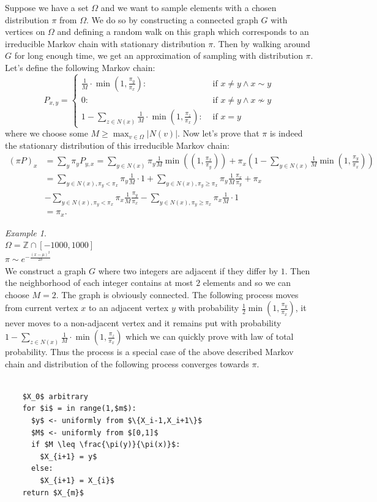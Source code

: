 \documentclass[a4paper, 12pt]{book}
\theoremstyle{definition}
\theoremstyle{remark}
\newtheorem*{ex}{Example}
\newcommand{\Z}{\mathbb{Z}}
\begin{document}
Suppose we have a set $\Omega$ and we want to sample elements with a chosen distribution $\pi$ from $\Omega$. We do so by constructing 
a connected graph $G$ with vertices on $\Omega$ and defining a random walk on this graph which corresponds to an irreducible Markov chain
with stationary distribution $\pi$. Then by walking around $G$ for long enough time, we get an approximation of sampling with distribution $\pi$.
Let's define the following Markov chain:
$$P_{x,y} = \begin{cases}
  \frac{1}{M} \cdot \min \left(1, \frac{\pi_y}{\pi_x}\right): &\text{ if } x \neq y \land x \sim y \\
  0: &\text{ if } x \neq y \land x \nsim y \\
  1 - \sum_{z \in N(x)}\frac{1}{M} \cdot \min \left(1, \frac{\pi_z}{\pi_x}\right): &\text{ if } x = y
\end{cases}$$
where we choose some $M \geq \max_{v \in \Omega} |N(v)|$. Now let's prove that $\pi$ is indeed the stationary distribution of this irreducible
Markov chain:
\begin{align*}
  (\pi P)_x &= \sum_y \pi_y P_{y,x} =
    \sum_{y \in N(x)} \pi_y \frac{1}{M} \min \left(\left(1, \frac{\pi_x}{\pi_y}\right)\right)
    + \pi_x \left(1 - \sum_{y \in N(x)} \frac{1}{M} \min \left(1, \frac{\pi_y}{\pi_x}\right)\right) \\
  &= \sum_{y \in N(x), \pi_y < \pi_x} \pi_y \frac{1}{M} \cdot 1 +
    \sum_{y \in N(x), \pi_y \geq \pi_x} \pi_y \frac{1}{M} \frac{\pi_x}{\pi_y} + \pi_x \\
  &- \sum_{y \in N(x), \pi_y < \pi_x} \pi_x \frac{1}{M} \frac{\pi_y}{\pi_x} -
    \sum_{y \in N(x), \pi_y \geq \pi_x} \pi_x \frac{1}{M} \cdot 1 \\
  &= \pi_x.
\end{align*}
\begin{ex} \text{} \\
  $\Omega = \Z \cap [-1000,1000]$ \\
  $\pi \sim e^{-\frac{(x-\mu)^2}{2 \delta}}$ \\
  We construct a graph $G$ where two integers are adjacent if they differ by $1$. Then the neighborhood of each
  integer contains at most $2$ elements and so we can choose $M = 2$. The graph is obviously connected. The following
  process moves from current vertex $x$ to an adjacent vertex $y$ with probability $\frac{1}{2} \min \left(1, \frac{\pi_y}{\pi_x}\right)$,
  it never moves to a non-adjacent vertex and it remains put with probability $1 - \sum_{z \in N(x)}\frac{1}{M} \cdot \min \left(1, \frac{\pi_z}{\pi_x}\right)$
  which we can quickly prove with law of total probability. Thus the process is a special case of the above described
  Markov chain and distribution of the following process converges towards $\pi$.
  \\~\\
  \begin{lstlisting}
    $X_0$ arbitrary
    for $i$ = in range(1,$m$):
      $y$ <- uniformly from $\{X_i-1,X_i+1\}$
      $M$ <- uniformly from $[0,1]$
      if $M \leq \frac{\pi(y)}{\pi(x)}$:
        $X_{i+1} = y$
      else:
        $X_{i+1} = X_{i}$
    return $X_{m}$
  \end{lstlisting}
\end{ex}
\end{document}
